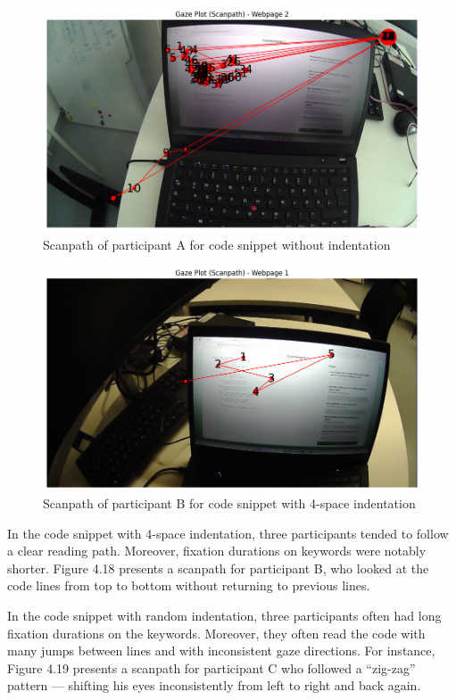 \begin{figure} [H]
  \centering
  \includegraphics[scale=0.6]{figures/0-ind-rechner.png}
  \caption{Scanpath of participant A for code snippet without indentation }
  \label{fig:AnhangsChor}
\end{figure}


\begin{figure} [H]
  \centering
  \includegraphics[scale=0.6]{figures/4-ind.png}
  \caption{Scanpath of participant B for code snippet with 4-space indentation}
  \label{fig:AnhangsChor}
\end{figure}

In the code snippet with 4-space indentation, three participants tended to follow a clear reading path. Moreover, fixation durations on keywords were notably shorter. Figure 4.18 presents a scanpath for participant B, who looked at the code lines from top to bottom without returning to previous lines.  


In the code snippet with random indentation, three participants often had long fixation durations on the keywords. Moreover, they often read the code with many jumps between lines and with inconsistent gaze directions. For instance, Figure 4.19 presents a scanpath for participant C who followed a “zig-zag” pattern — shifting his eyes inconsistently from left to right and back again.  



